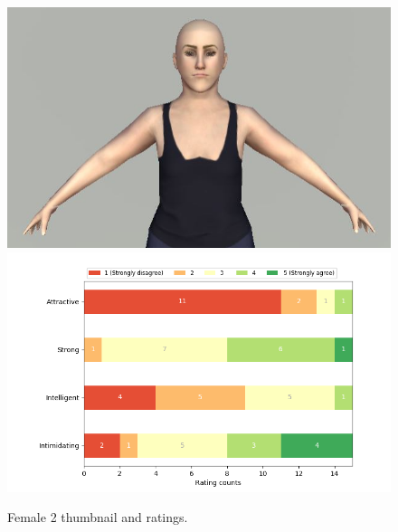 \begin{figure}[H]
  \includegraphics[width=\linewidth]{Images/Females/2.JPG}
\endminipage\hfill
{}
  \includegraphics[width=\linewidth]{Survey/FRatings/avatar_f2.png}
\endminipage\hfill
\caption{Female 2 thumbnail and ratings.}
\end{figure}

